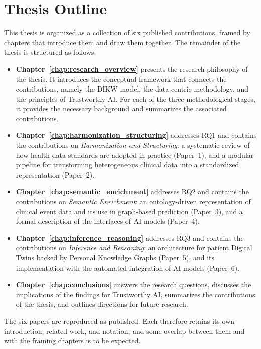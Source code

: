 \section{Thesis Outline}
\label{sec:thesis_outline}

This thesis is organized as a collection of six published contributions, framed by chapters that introduce them and draw them together. The remainder of the thesis is structured as follows.

\begin{itemize}

\item \textbf{Chapter~\ref{chap:research_overview}} presents the research philosophy of the thesis. It introduces the conceptual framework that connects the contributions, namely the DIKW model, the data-centric methodology, and the principles of Trustworthy AI. For each of the three methodological stages, it provides the necessary background and summarizes the associated contributions.

\item \textbf{Chapter~\ref{chap:harmonization_structuring}} addresses RQ1 and contains the contributions on \emph{Harmonization and Structuring}: a systematic review of how health data standards are adopted in practice (Paper~1), and a modular pipeline for transforming heterogeneous clinical data into a standardized representation (Paper~2).

\item \textbf{Chapter~\ref{chap:semantic_enrichment}} addresses RQ2 and contains the contributions on \emph{Semantic Enrichment}: an ontology-driven representation of clinical event data and its use in graph-based prediction (Paper~3), and a formal description of the interfaces of AI models (Paper~4).

\item \textbf{Chapter~\ref{chap:inference_reasoning}} addresses RQ3 and contains the contributions on \emph{Inference and Reasoning}: an architecture for patient Digital Twins backed by Personal Knowledge Graphs (Paper~5), and its implementation with the automated integration of AI models (Paper~6).

\item \textbf{Chapter~\ref{chap:conclusions}} answers the research questions, discusses the implications of the findings for Trustworthy AI, summarizes the contributions of the thesis, and outlines directions for future research.

\end{itemize}

\noindent The six papers are reproduced as published. Each therefore retains its own introduction, related work, and notation, and some overlap between them and with the framing chapters is to be expected.
